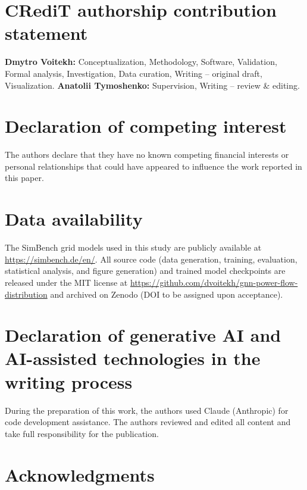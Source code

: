 \documentclass[preprint,review,12pt]{elsarticle}
\begin{document}
\section*{CRediT authorship contribution statement}

\textbf{Dmytro Voitekh:} Conceptualization, Methodology, Software, Validation, Formal analysis, Investigation, Data curation, Writing -- original draft, Visualization.
\textbf{Anatolii Tymoshenko:} Supervision, Writing -- review \& editing.

\section*{Declaration of competing interest}

The authors declare that they have no known competing financial interests or personal relationships that could have appeared to influence the work reported in this paper.

\section*{Data availability}

The SimBench grid models used in this study are publicly available at \url{https://simbench.de/en/}. All source code (data generation, training, evaluation, statistical analysis, and figure generation) and trained model checkpoints are released under the MIT license at \url{https://github.com/dvoitekh/gnn-power-flow-distribution} and archived on Zenodo (DOI to be assigned upon acceptance).

\section*{Declaration of generative AI and AI-assisted technologies in the writing process}

During the preparation of this work, the authors used Claude (Anthropic) for code development assistance. The authors reviewed and edited all content and take full responsibility for the publication.

\section*{Acknowledgments}
\end{document}
